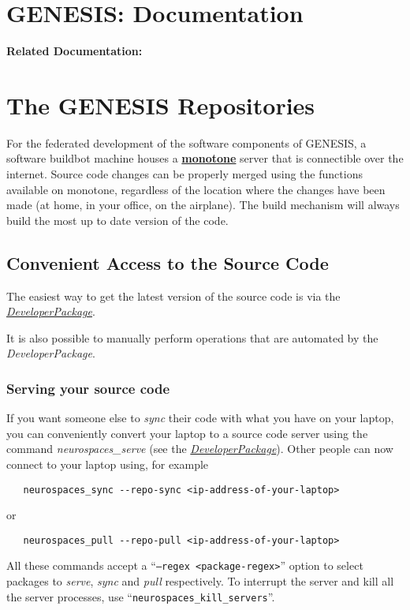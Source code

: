 \documentclass[12pt]{article}
\begin{document}
\section*{GENESIS: Documentation}

{\bf Related Documentation:}

\section*{The GENESIS Repositories}

For the federated development of the software components of GENESIS, a software buildbot machine houses a \href{http://monotone.ca/}{\bf monotone} server that is connectible over the internet. Source code changes can be properly merged using the functions available on monotone, regardless of the location where the changes have been made (at home, in your office, on the airplane). The build mechanism will always build the most up to date version of the code.

\subsection*{Convenient Access to the Source Code}

The easiest way to get the latest version of the source code is via the \href{../developer-package/developer-package.tex}{\it DeveloperPackage}.

It is also possible to manually perform operations that are automated by the {\it DeveloperPackage}.

\subsubsection*{Serving your source code}

If you want someone else to {\it sync} their code with what you have on your laptop, you can conveniently convert your laptop to a source code server using the command {\it neurospaces\_serve} (see the \href{../developer-package/developer-package.tex}{\it DeveloperPackage}). Other people can now connect to your laptop using, for example
\begin{verbatim}
   neurospaces_sync --repo-sync <ip-address-of-your-laptop>
\end{verbatim}
or
\begin {verbatim}
   neurospaces_pull --repo-pull <ip-address-of-your-laptop>
\end{verbatim}
All these commands accept a ``{\tt --regex <package-regex>}'' option to select packages to {\it serve}, {\it sync} and {\it pull} respectively. To interrupt the server and kill all the server processes, use ``{\tt neurospaces\_kill\_servers}''.
\end{document}
